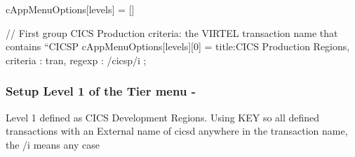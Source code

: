 \documentclass[letterpaper,10pt,english]{sphinxmanual}
\begin{document}

\begin{sphinxVerbatim}[commandchars=\\\{\}]
cAppMenuOptions[\PYGZdq{}levels\PYGZdq{}] = []

// First group \PYGZhy{} CICS Production \PYGZhy{} criteria: the VIRTEL transaction name that contains “CICSP\PYGZdq{}
cAppMenuOptions[\PYGZdq{}levels\PYGZdq{}][0] =  \PYGZob{}
        \PYGZdq{}title\PYGZdq{}:\PYGZdq{}CICS Production Regions\PYGZdq{},
        \PYGZdq{}criteria\PYGZdq{} : \PYGZdq{}tran\PYGZdq{},
        \PYGZdq{}regexp\PYGZdq{} : /cicsp/i
            \PYGZcb{};
\end{sphinxVerbatim}


\subsubsection{Setup Level 1 of the Tier menu - }
\label{\detokenize{Customization:setup-level-1-of-the-tier-menu-cics-development-regions}}
Level  1 defined as CICS Development Regions.  Using KEY  so all defined transactions with an External name of cicsd anywhere in the transaction name, the /i means any case


\begin{sphinxVerbatim}[commandchars=\\\{\}]
                
\PYG{p}{[}\PYG{p}{]}\PYG{p}{[}\PYG{p}{]}   
          
          
\end{sphinxVerbatim}
\end{document}
